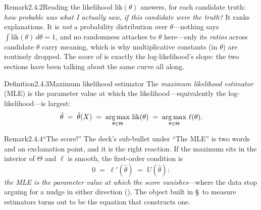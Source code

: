 \documentclass[main.tex]{subfiles}
\begin{document}
\begin{ObjL}{Remark}{2.4.2}{Reading the likelihood}
$\mathrm{lik}(\theta)$ answers, for each candidate truth: \emph{how probable was what I
actually saw, if this candidate were the truth?} It ranks explanations. It is
\emph{not} a probability distribution over $\theta$---nothing says
$\int \mathrm{lik}(\theta)\,d\theta=1$, and no randomness attaches to $\theta$
here---only its \emph{ratios} across candidate $\theta$ carry meaning, which
is why multiplicative constants (in $\theta$) are routinely dropped. The score of
 is exactly the log-likelihood's slope: the two sections have been talking
about the same curve all along.
\end{ObjL}

\begin{Obj}{Definition}{2.4.3}{Maximum likelihood estimator}
The \emph{maximum likelihood estimator} (MLE) is the parameter value at which the
likelihood---equivalently the log-likelihood---is largest:
\[ \hat\theta \;=\; \hat\theta(X) \;=\; \operatorname*{arg\,max}_{\theta\in\Theta}\, \mathrm{lik}(\theta)
   \;=\; \operatorname*{arg\,max}_{\theta\in\Theta}\, \ell(\theta) . \]
\end{Obj}

\begin{ObjL}{Remark}{2.4.4}{``The score!''}
The deck's sub-bullet under ``The MLE'' is two words and an exclamation point, and it is the
right reaction. If the maximum sits in the interior of $\Theta$ and $\ell$ is smooth, the
first-order condition is
\[ 0 \;=\; \ell'(\hat\theta) \;=\; U(\hat\theta) : \]
\emph{the MLE is the parameter value at which the score vanishes}---where the data stop
arguing for a nudge in either direction (). The object built in \S\,
to measure estimators turns out to be the equation that constructs one.
\end{ObjL}
\end{document}
